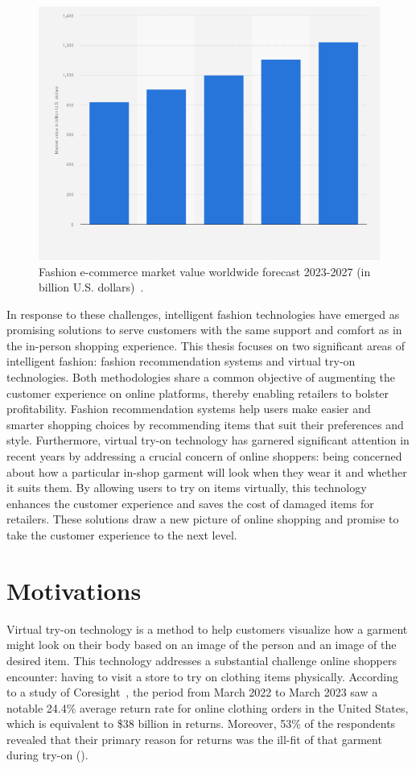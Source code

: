 \begin{figure}[h!]
    \centering
    \includegraphics[width=0.7\linewidth]{content/resources/images/introduction/fashon-online-market.png}
    \caption{Fashion e-commerce market value worldwide forecast 2023-2027 (in billion U.S. dollars)~\cite{Fashion2327-Statista2023}.}
    \label{fig:market-forecast}
\end{figure}

In response to these challenges, intelligent fashion technologies have emerged as promising solutions to serve customers with the same support and comfort as in the in-person shopping experience. This thesis focuses on two significant areas of intelligent fashion: fashion recommendation systems and virtual try-on technologies. Both methodologies share a common objective of augmenting the customer experience on online platforms, thereby enabling retailers to bolster profitability. Fashion recommendation systems help users make easier and smarter shopping choices by recommending items that suit their preferences and style. Furthermore, virtual try-on technology has garnered significant attention in recent years by addressing a crucial concern of online shoppers: being concerned about how a particular in-shop garment will look when they wear it and whether it suits them. By allowing users to try on items virtually, this technology enhances the customer experience and saves the cost of damaged items for retailers. These solutions draw a new picture of online shopping and promise to take the customer experience to the next level.

\section{Motivations}

Virtual try-on technology is a method to help customers visualize how a garment might look on their body based on an image of the person and an image of the desired item. This technology addresses a substantial challenge online shoppers encounter: having to visit a store to try on clothing items physically. According to a study of Coresight~\cite{web-try-on-motivation},  the period from March 2022 to March 2023 saw a notable 24.4\% average return rate for online clothing orders in the United States, which is equivalent to \$38 billion in returns. Moreover, 53\% of the respondents revealed that their primary reason for returns was the ill-fit of that garment during try-on (\cite{web-try-on-motivation}).

